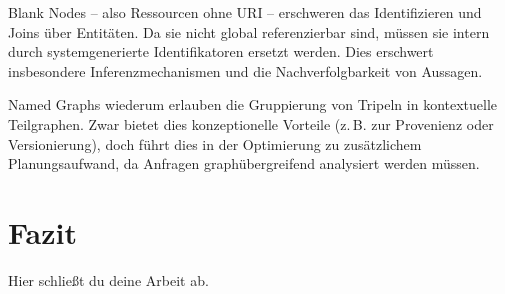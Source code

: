 \documentclass[12pt]{article}
\begin{document}
Blank Nodes – also Ressourcen ohne URI – erschweren das Identifizieren und Joins über Entitäten. Da sie nicht global referenzierbar sind, müssen sie intern durch systemgenerierte Identifikatoren ersetzt werden. Dies erschwert insbesondere Inferenzmechanismen und die Nachverfolgbarkeit von Aussagen.

Named Graphs wiederum erlauben die Gruppierung von Tripeln in kontextuelle Teilgraphen. Zwar bietet dies konzeptionelle Vorteile (z.\,B. zur Provenienz oder Versionierung), doch führt dies in der Optimierung zu zusätzlichem Planungsaufwand, da Anfragen graphübergreifend analysiert werden müssen.



\section{Fazit}
Hier schließt du deine Arbeit ab.

\printbibliography
\end{document}
